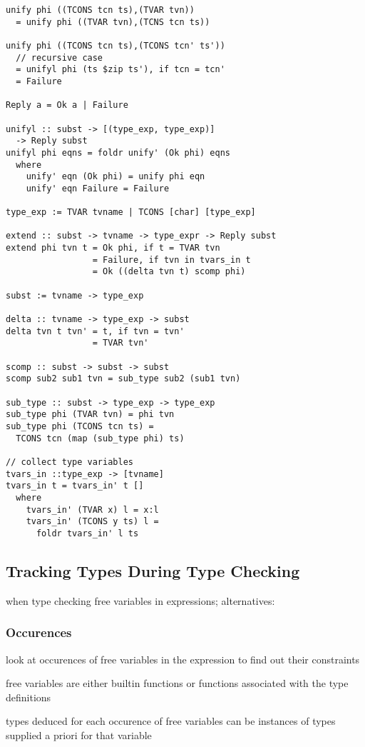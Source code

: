 \documentclass[8pt]{extarticle}
\begin{document}
\begin{multicols*}{2}
\begin{verbatim}
unify phi ((TCONS tcn ts),(TVAR tvn))
  = unify phi ((TVAR tvn),(TCNS tcn ts))

unify phi ((TCONS tcn ts),(TCONS tcn' ts'))
  // recursive case
  = unifyl phi (ts $zip ts'), if tcn = tcn'
  = Failure

Reply a = Ok a | Failure

unifyl :: subst -> [(type_exp, type_exp)]
  -> Reply subst
unifyl phi eqns = foldr unify' (Ok phi) eqns
  where
    unify' eqn (Ok phi) = unify phi eqn
    unify' eqn Failure = Failure

type_exp := TVAR tvname | TCONS [char] [type_exp]

extend :: subst -> tvname -> type_expr -> Reply subst
extend phi tvn t = Ok phi, if t = TVAR tvn
                 = Failure, if tvn in tvars_in t
                 = Ok ((delta tvn t) scomp phi)

subst := tvname -> type_exp

delta :: tvname -> type_exp -> subst
delta tvn t tvn' = t, if tvn = tvn'
                 = TVAR tvn'

scomp :: subst -> subst -> subst
scomp sub2 sub1 tvn = sub_type sub2 (sub1 tvn)

sub_type :: subst -> type_exp -> type_exp
sub_type phi (TVAR tvn) = phi tvn
sub_type phi (TCONS tcn ts) =
  TCONS tcn (map (sub_type phi) ts)

// collect type variables
tvars_in ::type_exp -> [tvname]
tvars_in t = tvars_in' t []
  where
    tvars_in' (TVAR x) l = x:l
    tvars_in' (TCONS y ts) l =
      foldr tvars_in' l ts
\end{verbatim}

\vfill\null
\columnbreak

\subsection{Tracking Types During Type Checking}

when type checking free variables in expressions; alternatives:

\subsubsection{Occurences}
look at occurences of free variables in the expression to find out their constraints

free variables are either builtin functions or functions associated with the type definitions

types deduced for each occurence of free variables can be instances of types supplied a priori for that variable


\end{multicols*}
\end{document}
